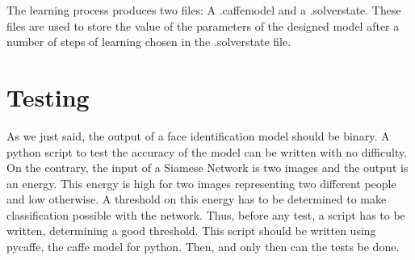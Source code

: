 The learning process produces two files: A .caffemodel and a .solverstate. These files are used to store the value of the parameters of the designed model after a number of steps of learning chosen in the .solverstate file.

\section{Testing}

As we just said, the output of a face identification model should be binary. A python script to test the accuracy of the model can be written with no difficulty. On the contrary, the input of a Siamese Network is two images and the output is an energy. This energy is high for two images representing two different people and low otherwise. A threshold on this energy has to be determined to make classification possible with the network. Thus, before any test, a script has to be written, determining a good threshold. This script should be written using pycaffe, the caffe model for python. Then, and only then can the tests be done.